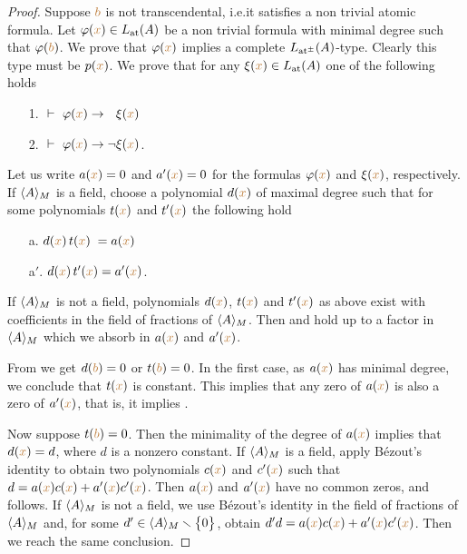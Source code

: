 \begin{proof}
Suppose ${\color{brown} b}$ is not transcendental, i.e.\@ it satisfies a non trivial atomic formula.
%
Let $\varphi({\color{brown} x})\in L_{\rm at}(A)$ be a non trivial formula with minimal degree such that $\varphi({\color{brown} b})$.
%
We prove that $\varphi({\color{brown} x})$ implies a complete $L_{\rm at^\pm}(A)$-type.
%
Clearly this type must be $p({\color{brown} x})$.
%
We prove that for any $\xi({\color{brown} x})\in L_{\rm at}(A)$ one of the following holds
\begin{itemize}
\item[1.] $\ \proves\ \phi({\mr x})\imp\phantom{\neg}\xi({\mr x})$
\item[2.] $\ \proves\ \phi({\mr x})\imp\neg\xi({\mr x})$.
\end{itemize} 
Let us write $a({\color{brown} x})=0$ and $a'({\color{brown} x})=0$ for the formulas $\varphi({\color{brown} x})$ and $\xi({\color{brown} x})$, respectively.
%
If $\langle A\rangle_M$ is a field, choose a polynomial $d({\color{brown} x})$ of maximal degree such that for some polynomials $t({\color{brown} x})$ and $t'({\color{brown} x})$ the following hold
\begin{itemize}
\item[a.] $d({\color{brown} x})\,t({\color{brown} x})\;=a({\color{brown} x})$
\item[a$'.$] $d({\color{brown} x})\,t'({\color{brown} x})=a'({\color{brown} x})$.
\end{itemize}

If $\langle A\rangle_M$ is not a field, polynomials $d({\color{brown} x})$, $t({\color{brown} x})$ and $t'({\color{brown} x})$ as above exist with coefficients in the field of fractions of $\langle A\rangle_M$.
%
Then  and  hold up to a factor in $\langle A\rangle_M$ which we absorb in $a({\color{brown} x})$ and $a'({\color{brown} x})$.

From  we get $d({\color{brown} b})=0$ or $t({\color{brown} b})=0$.
%
In the first case, as $a({\color{brown} x})$ has minimal degree, we conclude that $t({\color{brown} x})$ is constant.
%
This implies that any zero of $a({\color{brown} x})$ is also a zero of $a'({\color{brown} x})$, that is, it implies .

Now suppose $t({\color{brown} b})=0$.
%
Then the minimality of the degree of $a({\color{brown} x})$ implies that $d({\color{brown} x})=d$, where $d$ is a nonzero constant.
%
If $\langle A\rangle_M$ is a field, apply B\'ezout's identity to obtain two polynomials $c({\color{brown} x})$ and $c'({\color{brown} x})$ such that $d=a({\color{brown} x})c({\color{brown} x})+a'({\color{brown} x})c'({\color{brown} x})$.
%
Then $a({\color{brown} x})$ and $a'({\color{brown} x})$ have no common zeros, and  follows.
%
If $\langle A\rangle_M$ is not a field, we use  B\'ezout's identity in the field of fractions of $\langle A\rangle_M$ and, for some $d'\in\langle A\rangle_M\smallsetminus\big\{0\big\}$, obtain $d'd=a({\color{brown} x})c({\color{brown} x})+a'({\color{brown} x})c'({\color{brown} x})$.
%
Then we reach the same conclusion.
\end{proof}

